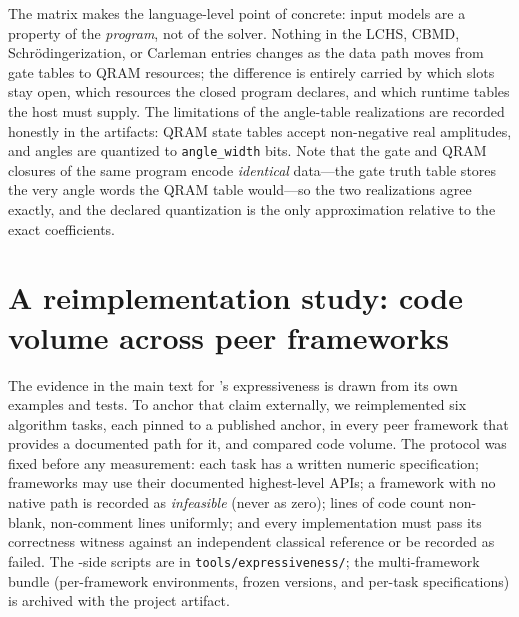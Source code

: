 The matrix makes the language-level point of
 concrete: input models are a property
of the \emph{program}, not of the solver.  Nothing in the LCHS, CBMD,
Schr\"odingerization, or Carleman entries changes as the data path moves
from gate tables to QRAM resources; the difference is entirely carried by
which slots stay open, which resources the closed program declares, and
which runtime tables the host must supply.  The limitations of the
angle-table realizations are recorded honestly in the artifacts: QRAM
state tables accept non-negative real amplitudes, and angles are
quantized to \texttt{angle\_width} bits.  Note that the gate and QRAM
closures of the same program encode \emph{identical} data---the gate
truth table stores the very angle words the QRAM table would---so the two
realizations agree exactly, and the declared quantization is the only
approximation relative to the exact coefficients.

\section{A reimplementation study: code volume across peer frameworks}
\label{app:expressiveness}

The evidence in the main text for \pqlang's expressiveness is drawn from its
own examples and tests.  To anchor that claim externally, we reimplemented
six algorithm tasks, each pinned to a published anchor, in every peer
framework that provides a documented path for it, and compared code
volume.  The protocol was fixed before any measurement: each task has a
written numeric specification; frameworks may use their documented
highest-level APIs; a framework with no native path is recorded as
\emph{infeasible} (never as zero); lines of code count non-blank,
non-comment lines uniformly; and every implementation must pass its
correctness witness against an independent classical reference or be
recorded as failed.  The \pqlang-side scripts are in
\texttt{tools/expressiveness/}; the multi-framework bundle (per-framework
environments, frozen versions, and per-task specifications) is archived
with the project artifact.

